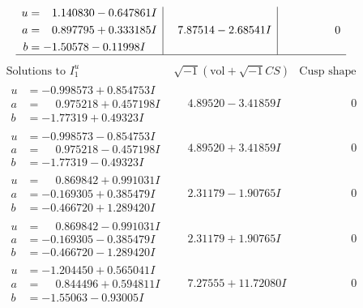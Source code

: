 \documentclass[1p]{elsarticle_modified}
\theoremstyle{definition}
\newcommand{\I}{\sqrt{-1}}
\begin{document}
$$\begin{array}{c|c|c}
\begin{aligned}
u &= \phantom{-}1.140830 - 0.647861 I \\
a &= \phantom{-}0.897795 + 0.333185 I \\
b &= -1.50578 - 0.11998 I\end{aligned}
 & \phantom{-}7.87514 - 2.68541 I & \phantom{-0.000000 } 0\\
 \hline 
 \end{array}$$\newpage$$\begin{array}{c|c|c}  
\text{Solutions to }I^u_{1}& \I (\text{vol} + \sqrt{-1}CS) & \text{Cusp shape}\\
 \hline 
\begin{aligned}
u &= -0.998573 + 0.854753 I \\
a &= \phantom{-}0.975218 + 0.457198 I \\
b &= -1.77319 + 0.49323 I\end{aligned}
 & \phantom{-}4.89520 - 3.41859 I & \phantom{-0.000000 } 0 \\ \hline\begin{aligned}
u &= -0.998573 - 0.854753 I \\
a &= \phantom{-}0.975218 - 0.457198 I \\
b &= -1.77319 - 0.49323 I\end{aligned}
 & \phantom{-}4.89520 + 3.41859 I & \phantom{-0.000000 } 0 \\ \hline\begin{aligned}
u &= \phantom{-}0.869842 + 0.991031 I \\
a &= -0.169305 + 0.385479 I \\
b &= -0.466720 + 1.289420 I\end{aligned}
 & \phantom{-}2.31179 - 1.90765 I & \phantom{-0.000000 } 0 \\ \hline\begin{aligned}
u &= \phantom{-}0.869842 - 0.991031 I \\
a &= -0.169305 - 0.385479 I \\
b &= -0.466720 - 1.289420 I\end{aligned}
 & \phantom{-}2.31179 + 1.90765 I & \phantom{-0.000000 } 0 \\ \hline\begin{aligned}
u &= -1.204450 + 0.565041 I \\
a &= \phantom{-}0.844496 + 0.594811 I \\
b &= -1.55063 - 0.93005 I\end{aligned}
 & \phantom{-}7.27555 + 11.72080 I & \phantom{-0.000000 } 0 \\ \hline\begin{aligned}

\end{aligned}
\end{array}$$
\end{document}
